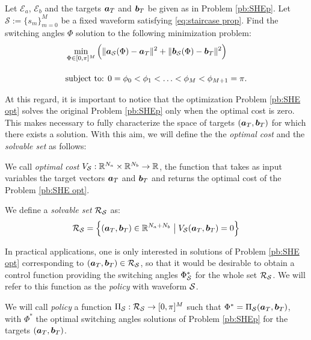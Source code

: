 \documentclass[twocolumn]{autart}    %
\begin{document}
\begin{problem}\label{pb:SHE opt}
Let $\mathcal{E}_a$, $\mathcal{E}_b$ and the targets $\bm{a}_T$ and $\bm{b}_T$ be given as in Problem \ref{pb:SHEp}.  Let $\mathcal S := \{ s_m\}_{m=0}^M$ be a fixed waveform satisfying \eqref{eq:staircase prop}.  Find the switching angles $\Phi$ solution to the following minimization problem:
\begin{align}
	&\min_{\Phi \in [0,\pi]^{M}} \Big( \|\bm{a}_{\mathcal{S}} (\Phi) - \bm{a}_T\|^2 + \| \bm{b}_{\mathcal{S}} (\Phi) - \bm{b}_T\|^2\Big)\notag 
	\\[10pt]
	&\mbox{subject to: } 0 = \phi_0 <\phi_1 < \ldots < \phi_{M} < \phi_{M+1} = \pi. \notag 
\end{align}
\end{problem}
At this regard, it is important to notice that the optimization Problem \ref{pb:SHE opt} solves the original Problem \ref{pb:SHEp} only when the optimal cost is zero. This makes necessary to fully characterize the space of targets $(\bm{a}_T,\bm{b}_T)$ for which there exists a solution. With this aim, we will define the the \textit{optimal cost} and the \textit{solvable set} as follows:
\vspace{1em}
\begin{definition}
We call \textit{optimal cost} $V_{\mathcal{S}}:\mathbb{R}^{N_a}\times \mathbb{R}^{N_b} \rightarrow \mathbb{R}$, the function that takes as input variables the target vectors $\bm{a}_T$ and $\bm{b}_T$ and returns the optimal cost of the Problem \ref{pb:SHE opt}.
\end{definition}

\vspace{1em}
\begin{definition}
We define a \textit{solvable set} $\mathcal{R}_{\mathcal{S}}$ as:
\begin{gather}
	\mathcal{R}_{\mathcal{S}} = \Big\{ (\bm{a}_T,\bm{b}_T) \in \mathbb{R}^{N_a+N_b}\;\big|\; V_{\mathcal{S}}(\bm{a}_T,\bm{b}_T) = 0\Big\}
\end{gather}
\end{definition}
In practical applications, one is only interested in solutions of Problem \ref{pb:SHE opt} corresponding to $(\bm{a}_T,\bm{b}_T) \in \mathcal{R}_{\mathcal{S}}$, so that it would be desirable to obtain a control function providing the switching angles $\Phi^*_{\mathcal{S}}$ for the whole set $\mathcal{R}_{\mathcal{S}}$. We will refer to this function as the \textit{policy} with waveform $\mathcal{S}$.

\vspace{1em}
\begin{definition}[policy]
We will call \textit{policy} a function $\Pi_{\mathcal{S}}: \mathcal{R}_{\mathcal{S}} \rightarrow [0,\pi]^M$ such that $\Phi^* = \Pi_{\mathcal{S}}(\bm{a}_T,\bm{b}_T)$, with $\Phi^*$ the optimal switching angles solutions of Problem \ref{pb:SHEp} for the targets $(\bm{a}_T,\bm{b}_T)$.
\end{definition} 
\end{document}
